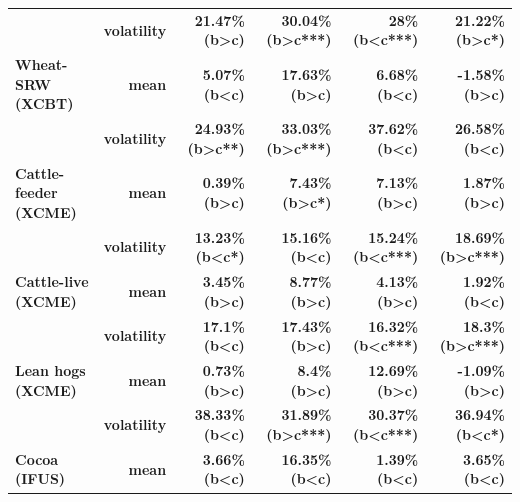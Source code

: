 \documentclass[
  authoryear,
  preprint,
  3p]{elsarticle}
\begin{document}
\begin{longtable}[t]{>{}l>{}r>{}r>{}r>{}r>{}r}
\textbf{} & \textbf{volatility} & \textcolor[HTML]{4285f4}{\textbf{21.47\% (b>c)}} & \textcolor[HTML]{4285f4}{\textbf{30.04\% (b>c***)}} & \textcolor[HTML]{4285f4}{\textbf{28\% (b<c***)}} & \textcolor[HTML]{4285f4}{\textbf{21.22\% (b>c*)}}\\
\addlinespace
\textbf{Wheat-SRW (XCBT)} & \textbf{mean} & \textcolor[HTML]{4285f4}{\textbf{5.07\% (b<c)}} & \textcolor[HTML]{4285f4}{\textbf{17.63\% (b>c)}} & \textcolor[HTML]{4285f4}{\textbf{6.68\% (b<c)}} & \textcolor[HTML]{4285f4}{\textbf{-1.58\% (b>c)}}\\
\textbf{} & \textbf{volatility} & \textcolor[HTML]{4285f4}{\textbf{24.93\% (b>c**)}} & \textcolor[HTML]{4285f4}{\textbf{33.03\% (b>c***)}} & \textcolor[HTML]{4285f4}{\textbf{37.62\% (b<c)}} & \textcolor[HTML]{4285f4}{\textbf{26.58\% (b<c)}}\\
\textbf{Cattle-feeder (XCME)} & \textbf{mean} & \textcolor[HTML]{4285f4}{\textbf{0.39\% (b>c)}} & \textcolor[HTML]{4285f4}{\textbf{7.43\% (b>c*)}} & \textcolor[HTML]{4285f4}{\textbf{7.13\% (b>c)}} & \textcolor[HTML]{4285f4}{\textbf{1.87\% (b>c)}}\\
\textbf{} & \textbf{volatility} & \textcolor[HTML]{4285f4}{\textbf{13.23\% (b<c*)}} & \textcolor[HTML]{4285f4}{\textbf{15.16\% (b<c)}} & \textcolor[HTML]{4285f4}{\textbf{15.24\% (b<c***)}} & \textcolor[HTML]{4285f4}{\textbf{18.69\% (b>c***)}}\\
\textbf{Cattle-live (XCME)} & \textbf{mean} & \textcolor[HTML]{4285f4}{\textbf{3.45\% (b>c)}} & \textcolor[HTML]{4285f4}{\textbf{8.77\% (b>c)}} & \textcolor[HTML]{4285f4}{\textbf{4.13\% (b>c)}} & \textcolor[HTML]{4285f4}{\textbf{1.92\% (b<c)}}\\
\addlinespace
\textbf{} & \textbf{volatility} & \textcolor[HTML]{4285f4}{\textbf{17.1\% (b<c)}} & \textcolor[HTML]{4285f4}{\textbf{17.43\% (b>c)}} & \textcolor[HTML]{4285f4}{\textbf{16.32\% (b<c***)}} & \textcolor[HTML]{4285f4}{\textbf{18.3\% (b>c***)}}\\
\textbf{Lean hogs (XCME)} & \textbf{mean} & \textcolor[HTML]{4285f4}{\textbf{0.73\% (b>c)}} & \textcolor[HTML]{4285f4}{\textbf{8.4\% (b>c)}} & \textcolor[HTML]{4285f4}{\textbf{12.69\% (b>c)}} & \textcolor[HTML]{4285f4}{\textbf{-1.09\% (b>c)}}\\
\textbf{} & \textbf{volatility} & \textcolor[HTML]{4285f4}{\textbf{38.33\% (b<c)}} & \textcolor[HTML]{4285f4}{\textbf{31.89\% (b>c***)}} & \textcolor[HTML]{4285f4}{\textbf{30.37\% (b<c***)}} & \textcolor[HTML]{4285f4}{\textbf{36.94\% (b<c*)}}\\
\textbf{Cocoa (IFUS)} & \textbf{mean} & \textcolor[HTML]{4285f4}{\textbf{3.66\% (b<c)}} & \textcolor[HTML]{4285f4}{\textbf{16.35\% (b<c)}} & \textcolor[HTML]{4285f4}{\textbf{1.39\% (b<c)}} & \textcolor[HTML]{4285f4}{\textbf{3.65\% (b<c)}}\\

\end{longtable}
\end{document}
